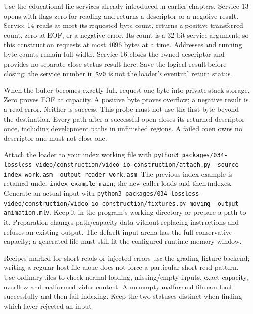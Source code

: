 Use the educational file services already introduced in earlier chapters.
Service 13 opens with flags zero for reading and returns a descriptor or a
negative result. Service 14 reads at most its requested byte count, returns a
positive transferred count, zero at EOF, or a negative error. Its count is a
32-bit service argument, so this construction requests at most 4096 bytes at a
time. Addresses and running byte counts remain full-width. Service 16 closes
the owned descriptor and provides no separate close-status result here. Save
the logical result before closing; the service number in \texttt{\$v0} is
not the loader's eventual return status.

When the buffer becomes exactly full, request one byte into private stack storage.
Zero proves EOF at capacity. A positive byte proves overflow; a negative result
is a read error. Neither is success. This probe must not use the first byte beyond
the destination. Every path after a successful open closes its returned descriptor
once, including development paths in unfinished regions. A failed open owns no
descriptor and must not close one.

Attach the loader to your index working file with
\texttt{python3 packages/034-lossless-video/construction/video-io-construction/attach.py --source index-work.asm
  --output reader-work.asm}. The previous index example is retained under
\texttt{index\_example\_main}; the new caller loads and then indexes. Generate
an actual input with \texttt{python3 packages/034-lossless-video/construction/video-io-construction/fixtures.py
  moving --output animation.mlv}. Keep it in the program's working directory or
prepare a path to it. Preparation changes path/capacity data without replacing
instructions and refuses an existing output. The default input arena has the
full conservative capacity; a generated file must still fit the configured
runtime memory window.

Recipes marked for short reads or injected errors use the grading fixture backend;
writing a regular host file alone does not force a particular short-read pattern.
Use ordinary files to check normal loading, missing/empty inputs, exact capacity,
overflow and malformed video content. A nonempty malformed file can load
successfully and then fail indexing. Keep the two statuses distinct when finding
which layer rejected an input.
